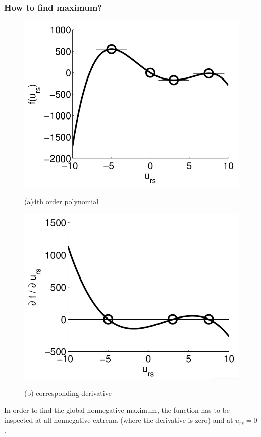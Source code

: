 \documentclass{beamer}
\begin{document}
\begin{frame}\frametitle{How to find maximum?}
\begin{figure}
\begin{minipage}[b]{0.5\linewidth}
\centerline{\includegraphics[scale=0.2]{images/pic1}}
\centerline{(a)4th order polynomial}  
\end{minipage}%
\hfill
\begin{minipage}[b]{0.5\linewidth}
\centerline{\includegraphics[scale=0.2]{images/pic2}}
\centerline{(b) corresponding derivative}
\end{minipage}
\end{figure}
In order to find the global nonnegative maximum, the function has to be inspected at all nonnegative extrema (where the derivative is zero) and at
$u_{rs}=0$.
\end{frame}
\end{document}

